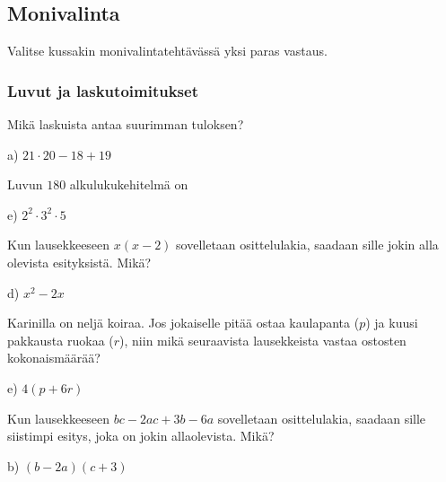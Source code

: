 \newpage
\subsection*{Monivalinta}

Valitse kussakin monivalintatehtävässä yksi paras vastaus.


\subsubsection*{Luvut ja laskutoimitukset}
\begin{multicols}{2}

\begin{tehtava}
Mikä laskuista antaa suurimman tuloksen?
	\begin{vastaus}
	 a) $21\cdot 20-18+19$
	\end{vastaus}
\end{tehtava}

\begin{tehtava}
Luvun $180$ alkulukukehitelmä on
	\begin{vastaus}
	 e) $2^2\cdot3^2\cdot5$
	\end{vastaus}
\end{tehtava}

\begin{tehtava}
Kun lausekkeeseen $x(x-2)$ sovelletaan osittelulakia, saadaan sille jokin alla olevista esityksistä. Mikä?
    \begin{vastaus}
	d) $x^2-2x$
    \end{vastaus}
\end{tehtava}

\begin{tehtava}
Karinilla on neljä koiraa. Jos jokaiselle pitää ostaa kaulapanta ($p$) ja kuusi pakkausta ruokaa ($r$), niin mikä seuraavista lausekkeista vastaa ostosten kokonaismäärää?
    \begin{vastaus}
	e) $4(p+6r)$
    \end{vastaus}
\end{tehtava}

\begin{tehtava}
Kun lausekkeeseen $bc-2ac+3b-6a$ sovelletaan osittelulakia, saadaan sille siistimpi esitys, joka on jokin allaolevista. Mikä?
    \begin{vastaus}
	b) $(b-2a)(c+3)$
    \end{vastaus}
\end{tehtava}


\end{multicols}
